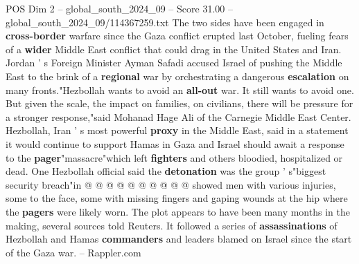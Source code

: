 \begin{textsample}{POS Dim 2 – global\_south\_2024\_09 – Score 31.00 – global\_south\_2024\_09/114367259.txt}
The two sides have been engaged in \textbf{cross-border} warfare since the Gaza conflict erupted last October, fueling fears of a \textbf{wider} Middle East conflict that could drag in the United States and Iran.
Jordan ' s Foreign Minister Ayman Safadi accused Israel of pushing the Middle East to the brink of a \textbf{regional} war by orchestrating a dangerous \textbf{escalation} on many fronts."Hezbollah wants to avoid an \textbf{all-out} war.
It still wants to avoid one.
But given the scale, the impact on families, on civilians, there will be pressure for a stronger response,"said Mohanad Hage Ali of the Carnegie Middle East Center.
Hezbollah, Iran ' s most powerful \textbf{proxy} in the Middle East, said in a statement it would continue to support Hamas in Gaza and Israel should await a response to the \textbf{pager}"massacre"which left \textbf{fighters} and others bloodied, hospitalized or dead.
One Hezbollah official said the \textbf{detonation} was the group ' s"biggest security breach"in @ @ @ @ @ @ @ @ @ @ showed men with various injuries, some to the face, some with missing fingers and gaping wounds at the hip where the \textbf{pagers} were likely worn.
The plot appears to have been many months in the making, several sources told Reuters.
It followed a series of \textbf{assassinations} of Hezbollah and Hamas \textbf{commanders} and leaders blamed on Israel since the start of the Gaza war. -- Rappler.com

\end{textsample}
